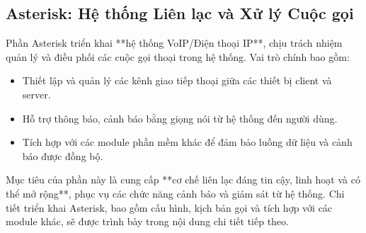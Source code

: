 \subsection{Asterisk: Hệ thống Liên lạc và Xử lý Cuộc gọi}
\label{sec:asterisk_overview}

Phần Asterisk triển khai **hệ thống VoIP/Điện thoại IP**, chịu trách nhiệm quản lý và điều phối các cuộc gọi thoại trong hệ thống. Vai trò chính bao gồm:
\begin{itemize}
    \item Thiết lập và quản lý các kênh giao tiếp thoại giữa các thiết bị client và server.
    \item Hỗ trợ thông báo, cảnh báo bằng giọng nói từ hệ thống đến người dùng.
    \item Tích hợp với các module phần mềm khác để đảm bảo luồng dữ liệu và cảnh báo được đồng bộ.
\end{itemize}

Mục tiêu của phần này là cung cấp **cơ chế liên lạc đáng tin cậy, linh hoạt và có thể mở rộng**, phục vụ các chức năng cảnh báo và giám sát từ hệ thống. Chi tiết triển khai Asterisk, bao gồm cấu hình, kịch bản gọi và tích hợp với các module khác, sẽ được trình bày trong nội dung chi tiết tiếp theo.

